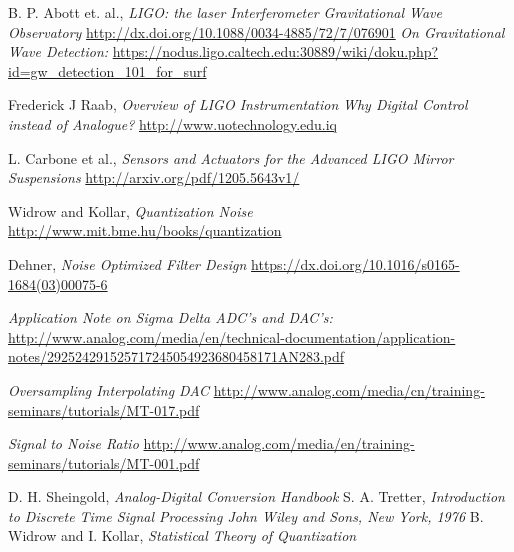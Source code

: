 \documentclass[colorlinks=true,pdfstartview=FitV,linkcolor=blue,
            citecolor=red,urlcolor=magenta]{ligodoc}
\begin{document}
\begin{thebibliography}{13}  
 B. P. Abott et. al.,  
				\emph{LIGO: the laser Interferometer Gravitational Wave Observatory} 							\url{http://dx.doi.org/10.1088/0034-4885/72/7/076901}
 \emph{On Gravitational Wave Detection: }
			\url{https://nodus.ligo.caltech.edu:30889/wiki/doku.php?id=gw_detection_101_for_surf}

 Frederick J Raab, \emph{Overview of LIGO Instrumentation}
 \emph{Why Digital Control instead of Analogue?} 												\url{http://www.uotechnology.edu.iq}

 L. Carbone et al., \emph{Sensors and Actuators for the Advanced LIGO Mirror Suspensions}
									\url{http://arxiv.org/pdf/1205.5643v1/}
									
 Widrow and Kollar, \emph{Quantization Noise} 				\url{http://www.mit.bme.hu/books/quantization}

 Dehner, \emph{Noise Optimized Filter Design} 		\url{https://dx.doi.org/10.1016/s0165-1684(03)00075-6}

 \emph{Application Note on Sigma Delta ADC's and DAC's:} \url{http://www.analog.com/media/en/technical-documentation/application-notes/292524291525717245054923680458171AN283.pdf}

\emph{Oversampling Interpolating DAC}	\url{http://www.analog.com/media/cn/training-seminars/tutorials/MT-017.pdf}

 \emph{Signal to Noise Ratio} 
				\url{http://www.analog.com/media/en/training-seminars/tutorials/MT-001.pdf}
				
 D. H. Sheingold, \emph{Analog-Digital Conversion Handbook}
 S. A. Tretter, \emph{Introduction to Discrete Time Signal Processing John Wiley and Sons, New York, 1976}
 B. Widrow and I. Kollar, \emph{Statistical Theory of Quantization}

\end{thebibliography}        
\end{document}

